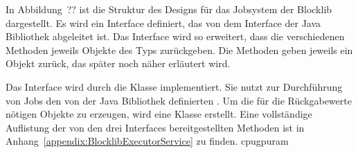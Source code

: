 \documentclass[12pt,a4paper,listof=totocnumbered,parskip=half]{scrartcl}
\begin{document}
In Abbildung~?? ist die Struktur des Designs für das Jobsystem der Blocklib dargestellt. Es wird ein Interface  definiert, das von dem Interface  der Java Bibliothek abgeleitet ist. Das Interface wird so erweitert, dass die verschiedenen  Methoden jeweils Objekte des Typs  zurückgeben. Die  Methoden geben jeweils ein  Objekt zurück, das später noch näher erläutert wird.

Das Interface  wird durch die Klasse  implementiert. Sie nutzt zur Durchführung von Jobs den von der Java Bibliothek definierten . Um die für die Rückgabewerte nötigen  Objekte zu erzeugen, wird eine Klasse  erstellt. Eine vollständige Auflistung der von den drei Interfaces bereitgestellten Methoden ist in Anhang~\ref{appendix:BlocklibExecutorService} zu finden. 
\pgfplotsset{
	height=4cm,
}
\si[]{\fps}\ac{cpu}\ac{gpu}\ac{ram}\\


\end{document}
